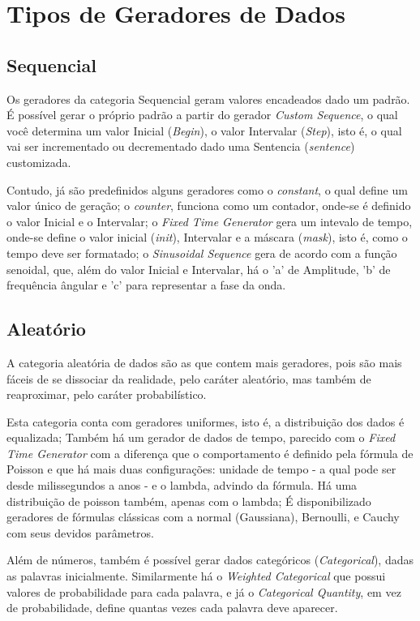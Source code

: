 \documentclass[
	12pt,				%
	openright,			%
	twoside,			%
	a4paper,			%
	english,			%
	brazil				%
	]{abntex2}
\begin{document}
	\section{Tipos de Geradores de Dados}
		\subsection{Sequencial}
			Os geradores da categoria Sequencial geram valores encadeados dado um padrão.
			É possível gerar o próprio padrão a partir do gerador \emph{Custom Sequence}, o qual você determina um valor Inicial (\emph{Begin}), o valor Intervalar (\emph{Step}), isto é, o qual vai ser incrementado ou decrementado dado uma Sentencia (\emph{sentence}) customizada.
			\par
			Contudo, já são predefinidos alguns geradores como 
				o \emph{constant}, o qual define um valor único de geração;
				o \emph{counter}, funciona como um contador, onde-se é definido o valor Inicial e o Intervalar;
				o \emph{Fixed Time Generator} gera um intevalo de tempo, onde-se define o valor inicial (\emph{init}), Intervalar e a máscara (\emph{mask}), isto é, como o tempo deve ser formatado;
				o \emph{Sinusoidal Sequence} gera de acordo com a função senoidal, que, além do valor Inicial e Intervalar, há o 'a' de Amplitude, 'b' de frequência ângular e 'c' para representar a fase da onda.

		\subsection{Aleatório}
			A categoria aleatória de dados são as que contem mais geradores, pois são mais fáceis de se dissociar da realidade, pelo caráter aleatório, mas também de reaproximar, pelo caráter probabilístico.
			\par
			Esta categoria conta com geradores uniformes, isto é, a distribuição dos dados é equalizada;
				Também há um gerador de dados de tempo, parecido com o \emph{Fixed Time Generator} com a diferença que o comportamento é definido pela fórmula de Poisson e que há mais duas configurações: unidade de tempo - a qual pode ser desde milissegundos a anos - e o lambda, advindo da fórmula.
				Há uma distribuição de poisson também, apenas com o lambda;
				É disponibilizado geradores de fórmulas clássicas com a normal (Gaussiana), Bernoulli, e Cauchy com seus devidos parâmetros.
			\par
			Além de números, também é possível gerar dados categóricos (\emph{Categorical}), dadas as palavras inicialmente.
				Similarmente há o \emph{Weighted Categorical} que possui valores de probabilidade para cada palavra, e 
				já o \emph{Categorical Quantity}, em vez de probabilidade, define quantas vezes cada palavra deve aparecer.
\end{document}
